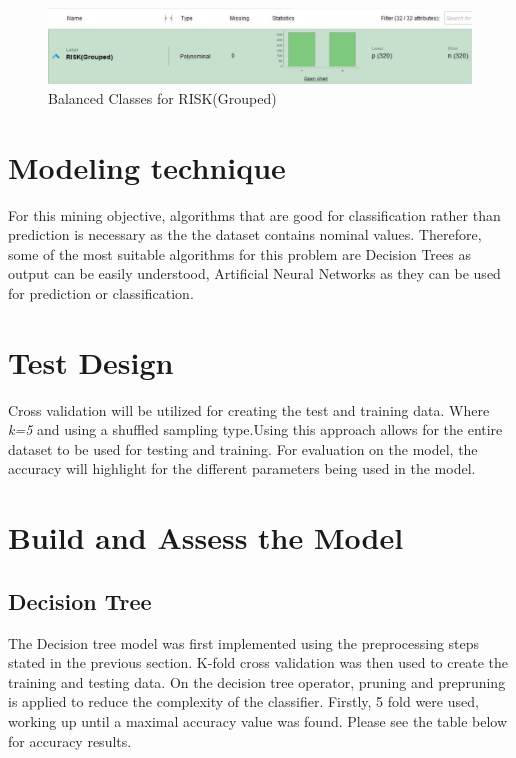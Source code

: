 \begin{figure}[ht]
	\begin{center}
		\advance\leftskip-3cm
		\advance\rightskip-3cm
		\includegraphics[keepaspectratio=true,scale=0.6]{__resources/balance.jpg}
		\caption{Balanced Classes for RISK(Grouped)}
		\label{balance}
	\end{center}
\end{figure}


\section*{Modeling technique}
For this mining objective, algorithms that are good for classification rather than prediction is necessary as the the dataset contains nominal values. Therefore, some of the most suitable algorithms for this problem are Decision Trees as output can be easily understood, Artificial Neural Networks as they can be used for prediction or classification.
\section*{Test Design}
Cross validation will be utilized for creating the test and training data. Where \textit{k=5} and using a shuffled sampling type.Using this approach allows for the entire dataset to be used for testing and training. 
For evaluation on the model, the accuracy will highlight for the different parameters being used in the model.

\section*{Build and Assess the Model}
\subsection*{Decision Tree}
The Decision tree model was first implemented using the preprocessing steps stated in the previous section. K-fold cross validation was then used to create the training and testing data. On the decision tree operator, pruning and prepruning is applied to reduce the complexity of the classifier. Firstly, 5 fold were used, working up until a maximal accuracy value was found. Please see the table below for accuracy results.

